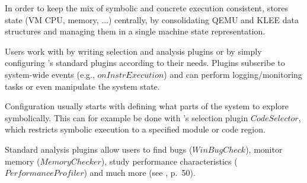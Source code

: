 In order to keep the mix of symbolic and concrete execution consistent, \sse stores state (VM CPU, memory, ...) centrally, by consolidating QEMU and KLEE data structures and managing them in a single machine state representation.


Users work with \sse by writing selection and analysis plugins or by simply configuring \sse's standard plugins according to their needs.
Plugins subscribe to system-wide events (e.g., $onInstrExecution$) and can perform logging/monitoring tasks or even manipulate the system state.

Configuration usually starts with defining what parts of the system to explore symbolically.
This can for example be done with \sse's selection plugin $CodeSelector$, which restricts symbolic execution to a specified module or code region.

Standard analysis plugins allow users to find bugs ($WinBugCheck$), monitor memory ($MemoryChecker$), study performance characteristics ($PerformanceProfiler$) and much more (see \cite{chip14s2e}, p.~50).



\iffalse
§3	The S2E Platform
		> Architektur
		> Funktionsweise
		> Selektoren + Analysatoren
\fi